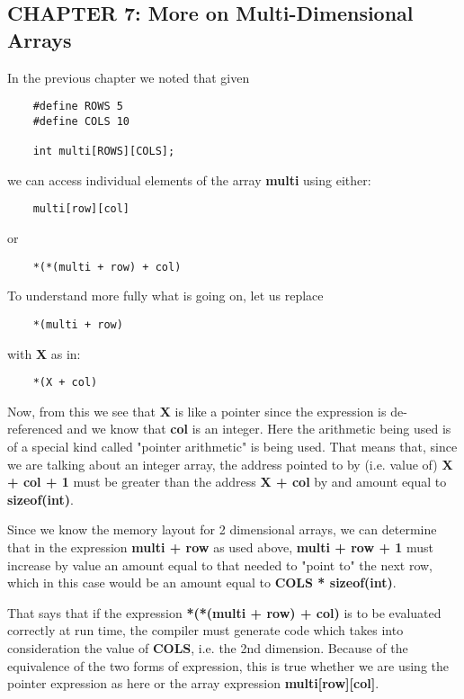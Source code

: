 \hypertarget{chapter-7-more-on-multi-dimensional-arrays}{%
\subsection{CHAPTER 7: More on Multi-Dimensional
Arrays}\label{chapter-7-more-on-multi-dimensional-arrays}}

In the previous chapter we noted that given

\begin{verbatim}
    #define ROWS 5
    #define COLS 10

    int multi[ROWS][COLS];
\end{verbatim}

we can access individual elements of the array \textbf{multi} using
either:

\begin{verbatim}
    multi[row][col]
\end{verbatim}

or

\begin{verbatim}
    *(*(multi + row) + col)
\end{verbatim}

To understand more fully what is going on, let us replace

\begin{verbatim}
    *(multi + row)
\end{verbatim}

with \textbf{X} as in:

\begin{verbatim}
    *(X + col)
\end{verbatim}

Now, from this we see that \textbf{X} is like a pointer since the
expression is de-referenced and we know that \textbf{col} is an integer.
Here the arithmetic being used is of a special kind called "pointer
arithmetic" is being used. That means that, since we are talking about
an integer array, the address pointed to by (i.e. value of) \textbf{X +
col + 1} must be greater than the address \textbf{X + col} by and amount
equal to \textbf{sizeof(int)}.

Since we know the memory layout for 2 dimensional arrays, we can
determine that in the expression \textbf{multi + row} as used above,
\textbf{multi + row + 1} must increase by value an amount equal to that
needed to "point to" the next row, which in this case would be an amount
equal to \textbf{COLS * sizeof(int)}.

That says that if the expression \textbf{*(*(multi + row) + col)} is to
be evaluated correctly at run time, the compiler must generate code
which takes into consideration the value of \textbf{COLS}, i.e. the 2nd
dimension. Because of the equivalence of the two forms of expression,
this is true whether we are using the pointer expression as here or the
array expression \textbf{multi{[}row{]}{[}col{]}}.

